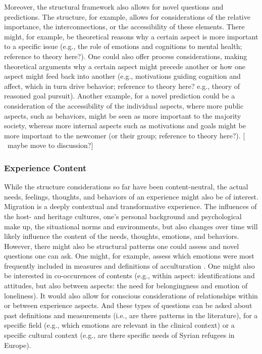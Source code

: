 \documentclass[man, 12pt, a4paper]{apa7}
\newcommand\Warning[1][2ex]{%
  \renewcommand\stacktype{L}%
  \scaleto{\stackon[1.3pt]{\color{red}$\triangle$}{\tiny\bfseries !}}{#1}}%
\begin{document}
Moreover, the structural framework also allows for novel questions and predictions. The structure, for example, allows for considerations of the relative importance, the interconnections, or the accessibility of these elements. There might, for example, be theoretical reasons why a certain aspect is more important to a specific issue (e.g., the role of emotions and cognitions to mental health; reference to theory here?). One could also offer process considerations, making theoretical arguments why a certain aspect might precede another or how one aspect might feed back into another (e.g., motivations guiding cognition and affect, which in turn drive behavior; reference to theory here? e.g., theory of reasoned goal pursuit). Another example, for a novel prediction could be a consideration of the accessibility of the individual aspects, where more public aspects, such as behaviors, might be seen as more important to the majority society, whereas more internal aspects such as motivations and goals might be more important to the newcomer (or their group; reference to theory here?). [\Warning\ maybe move to discussion?]

\subsubsection{Experience Content}
While the structure considerations so far have been content-neutral, the actual needs, feelings, thoughts, and behaviors of an experience might also be of interest. Migration is a deeply contextual and transformative experience. The influences of the host- and heritage cultures, one's personal background and psychological make up, the situational norms and environments, but also changes over time will likely influence the content of the needs, thoughts, emotions, and behaviors. 
However, there might also be structural patterns one could assess and novel questions one can ask. One might, for example, assess which emotions were most frequently included in measures and definitions of acculturation \citep[e.g., specific emotions such as anger or pride, but also types of emotions, such as positive or negative, or about yourself or others;][]{DeLeersnyder2017}. One might also be interested in co-occurences of contents (e.g., within aspect: identifications and attitudes, but also between aspects: the need for belongingness and emotion of loneliness). It would also allow for conscious considerations of relationships within or between experience aspects. And these types of questions can be asked about past definitions and measurements (i.e., are there patterns in the literature), for a specific field (e.g., which emotions are relevant in the clinical context) or a specific cultural context (e.g., are there specific needs of Syrian refugees in Europe). 
\end{document}
